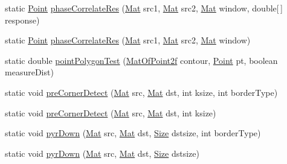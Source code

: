 \begin{DoxyCompactItemize}
\item 
static \mbox{\hyperlink{classorg_1_1opencv_1_1core_1_1_point}{Point}} \mbox{\hyperlink{classorg_1_1opencv_1_1imgproc_1_1_imgproc_a8f62667aea7153feaf585aff643a5826}{phase\+Correlate\+Res}} (\mbox{\hyperlink{classorg_1_1opencv_1_1core_1_1_mat}{Mat}} src1, \mbox{\hyperlink{classorg_1_1opencv_1_1core_1_1_mat}{Mat}} src2, \mbox{\hyperlink{classorg_1_1opencv_1_1core_1_1_mat}{Mat}} window, double\mbox{[}$\,$\mbox{]} response)
\item 
static \mbox{\hyperlink{classorg_1_1opencv_1_1core_1_1_point}{Point}} \mbox{\hyperlink{classorg_1_1opencv_1_1imgproc_1_1_imgproc_a1c576a2bdd5d4adfa3131049865be50e}{phase\+Correlate\+Res}} (\mbox{\hyperlink{classorg_1_1opencv_1_1core_1_1_mat}{Mat}} src1, \mbox{\hyperlink{classorg_1_1opencv_1_1core_1_1_mat}{Mat}} src2, \mbox{\hyperlink{classorg_1_1opencv_1_1core_1_1_mat}{Mat}} window)
\item 
static double \mbox{\hyperlink{classorg_1_1opencv_1_1imgproc_1_1_imgproc_a2cb96fabb468911c8a44b175091d77cd}{point\+Polygon\+Test}} (\mbox{\hyperlink{classorg_1_1opencv_1_1core_1_1_mat_of_point2f}{Mat\+Of\+Point2f}} contour, \mbox{\hyperlink{classorg_1_1opencv_1_1core_1_1_point}{Point}} pt, boolean measure\+Dist)
\item 
static void \mbox{\hyperlink{classorg_1_1opencv_1_1imgproc_1_1_imgproc_a7cd6f2951d4243689ad0915162a14541}{pre\+Corner\+Detect}} (\mbox{\hyperlink{classorg_1_1opencv_1_1core_1_1_mat}{Mat}} src, \mbox{\hyperlink{classorg_1_1opencv_1_1core_1_1_mat}{Mat}} dst, int ksize, int border\+Type)
\item 
static void \mbox{\hyperlink{classorg_1_1opencv_1_1imgproc_1_1_imgproc_ab624f1339b2cfe8cd1fb44f202184c16}{pre\+Corner\+Detect}} (\mbox{\hyperlink{classorg_1_1opencv_1_1core_1_1_mat}{Mat}} src, \mbox{\hyperlink{classorg_1_1opencv_1_1core_1_1_mat}{Mat}} dst, int ksize)
\item 
static void \mbox{\hyperlink{classorg_1_1opencv_1_1imgproc_1_1_imgproc_a9ecbfdf7bf014c1215841957f7e7b2ca}{pyr\+Down}} (\mbox{\hyperlink{classorg_1_1opencv_1_1core_1_1_mat}{Mat}} src, \mbox{\hyperlink{classorg_1_1opencv_1_1core_1_1_mat}{Mat}} dst, \mbox{\hyperlink{classorg_1_1opencv_1_1core_1_1_size}{Size}} dstsize, int border\+Type)
\item 
static void \mbox{\hyperlink{classorg_1_1opencv_1_1imgproc_1_1_imgproc_a44e5337193173eb9738b3bf1beb8af73}{pyr\+Down}} (\mbox{\hyperlink{classorg_1_1opencv_1_1core_1_1_mat}{Mat}} src, \mbox{\hyperlink{classorg_1_1opencv_1_1core_1_1_mat}{Mat}} dst, \mbox{\hyperlink{classorg_1_1opencv_1_1core_1_1_size}{Size}} dstsize)

\end{DoxyCompactItemize}
